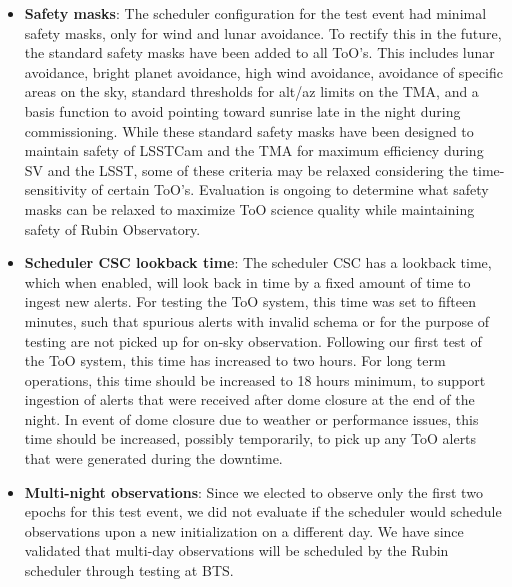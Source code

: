 \begin{itemize}
    \item \textbf{Safety masks}: The scheduler configuration for the test event had minimal safety masks, only for wind and lunar avoidance. To rectify this in the future, the standard safety masks have been added to all ToO's. This includes lunar avoidance, bright planet avoidance, high wind avoidance, avoidance of specific areas on the sky, standard thresholds for alt/az limits on the TMA, and a basis function to avoid pointing toward sunrise late in the night during commissioning. While these standard safety masks have been designed to maintain safety of LSSTCam and the TMA for maximum efficiency during SV and the LSST, some of these criteria may be relaxed considering the time-sensitivity of certain ToO's. Evaluation is ongoing to determine what safety masks can be relaxed to maximize ToO science quality while maintaining safety of Rubin Observatory.
    \item \textbf{Scheduler CSC lookback time}: The scheduler CSC has a lookback time, which when enabled, will look back in time by a fixed amount of time to ingest new alerts. For testing the ToO system, this time was set to fifteen minutes, such that spurious alerts with invalid schema or for the purpose of testing are not picked up for on-sky observation. Following our first test of the ToO system, this time has increased to two hours. For long term operations, this time should be increased to 18 hours minimum, to support ingestion of alerts that were received after dome closure at the end of the night. In event of dome closure due to weather or performance issues, this time should be increased, possibly temporarily, to pick up any ToO alerts that were generated during the downtime.
    \item \textbf{Multi-night observations}: Since we elected to observe only the first two epochs for this test event, we did not evaluate if the scheduler would schedule observations upon a new initialization on a different day. We have since validated that multi-day observations will be scheduled by the Rubin scheduler through testing at BTS.
\end{itemize}
